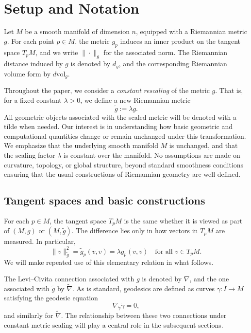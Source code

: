 \documentclass[11pt]{article}
\begin{document}
\section{Setup and Notation}

Let $M$ be a smooth manifold of dimension $n$, equipped with a Riemannian metric $g$. For each point $p \in M$, the metric $g_p$ induces an inner product on the tangent space $T_p M$, and we write $\|\cdot\|_g$ for the associated norm. The Riemannian distance induced by $g$ is denoted by $d_g$, and the corresponding Riemannian volume form by $d\mathrm{vol}_g$.

Throughout the paper, we consider a \textit{constant rescaling} of the metric $g$. That is, for a fixed constant $\lambda > 0$, we define a new Riemannian metric
\begin{equation*}
    \tilde g := \lambda g.
\end{equation*}
All geometric objects associated with the scaled metric will be denoted with a tilde when needed. Our interest is in understanding how basic geometric and computational quantities change or remain unchanged under this transformation. We emphasize that the underlying smooth manifold $M$ is unchanged, and that the scaling factor $\lambda$ is constant over the manifold. No assumptions are made on curvature, topology, or global structure, beyond standard smoothness conditions ensuring that the usual constructions of Riemannian geometry are well defined.

\subsection{Tangent spaces and basic constructions}

For each $p \in M$, the tangent space $T_p M$ is the same whether it is viewed as part of $(M,g)$ or $(M,\tilde g)$. The difference lies only in how vectors in $T_p M$ are measured. In particular,
\begin{equation*}
\|v\|_{\tilde g}^2 = \tilde g_p(v,v) = \lambda g_p(v,v)
\quad \text{for all } v \in T_p M.
\end{equation*}
We will make repeated use of this elementary relation in what follows.

The Levi--Civita connection associated with $g$ is denoted by $\nabla$, and the one associated with $\tilde g$ by $\tilde\nabla$. As is standard, geodesics are defined as curves $\gamma : I \to M$ satisfying the geodesic equation
\begin{equation*}
\nabla_{\dot\gamma} \dot\gamma = 0,
\end{equation*}
and similarly for $\tilde\nabla$. The relationship between these two connections under constant metric scaling will play a central role in the subsequent sections.
\end{document}
